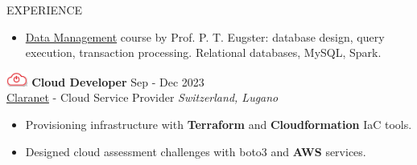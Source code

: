 \documentclass{cv} %
\def\intraexpvspace{0.15cm}
\begin{document}
\begin{minipage}[l]{0.7\linewidth}
\begin{rSection}{EXPERIENCE}
\begin{itemize}
        \item \href{https://search.usi.ch/it/corsi/35268184/data-management}{Data Management}
              course by Prof. P. T. Eugster: database design, query execution, transaction processing.
              Relational databases, MySQL, Spark.
    \end{itemize}
    \vspace{\intraexpvspace}
    \vspace{\intraexpvspace}

    \includegraphics[width=0.7cm, trim={0cm 15cm 0cm 0cm}]{claranet-logo.png}
    \textbf{Cloud Developer} \hfill Sep - Dec 2023\\
    \hspace*{0.85cm}\href{https://www.claranet.com/}{Claranet} - Cloud Service Provider
    \hfill \textit{Switzerland, Lugano}
    \begin{itemize}
        \item Provisioning infrastructure with \textbf{Terraform} and \textbf{Cloudformation}
            IaC tools.

        \item Designed cloud assessment challenges with boto3 and \textbf{AWS} services.
    \end{itemize}
    \vspace{\intraexpvspace}
    \vspace{\intraexpvspace}


\end{rSection}
\end{minipage}
\end{document}

